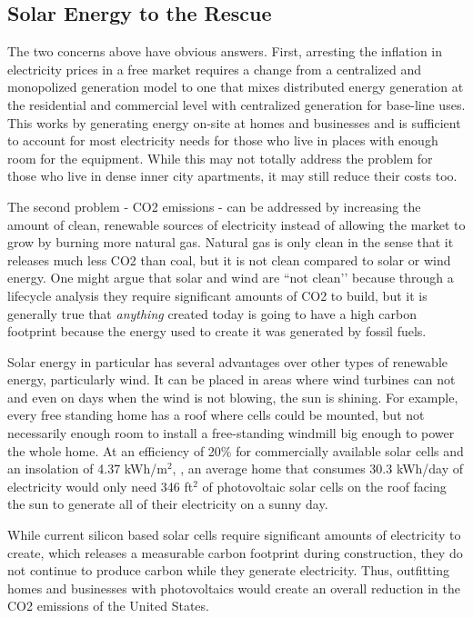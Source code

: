 \subsection{Solar Energy to the Rescue}
The two concerns above have obvious answers. First, arresting the inflation in electricity prices in a free market requires a change from a centralized and monopolized generation model to one that mixes distributed energy generation at the residential and commercial level with centralized generation for base-line uses. This works by generating energy on-site at homes and businesses and is sufficient to account for most electricity needs for those who live in places with enough room for the equipment. While this may not totally address the problem for those who live in dense inner city apartments, it may still reduce their costs too.

The second problem - CO2 emissions - can be addressed by increasing the amount of clean, renewable sources of electricity instead of allowing the market to grow by burning more natural gas. Natural gas is only clean in the sense that it releases much less CO2 than coal, but it is not clean compared to solar or wind energy. One might argue that solar and wind are ``not clean’’ because through a lifecycle analysis they require significant amounts of CO2 to build, but it is generally true that \textit{anything} created today is going to have a high carbon footprint because the energy used to create it was generated by fossil fuels.

Solar energy in particular has several advantages over other types of renewable energy, particularly wind. It can be placed in areas where wind turbines can not and even on days when the wind is not blowing, the sun is shining. For example, every free standing home has a roof where cells could be mounted, but not necessarily enough room to install a free-standing windmill big enough to power the whole home. At an efficiency of 20\% for commercially available solar cells and an insolation of 4.37 kWh/m$^2$, \cite{wholesaleSolar}, an average home that consumes 30.3 kWh/day of electricity \cite{eiaFAQ} would only need 346 ft$^2$ of photovoltaic solar cells on the roof facing the sun to generate all of their electricity on a sunny day. 

While current silicon based solar cells require significant amounts of electricity to create, which releases a measurable carbon footprint during construction, they do not continue to produce carbon while they generate electricity. Thus, outfitting homes and businesses with photovoltaics would create an overall reduction in the CO2 emissions of the United States.

